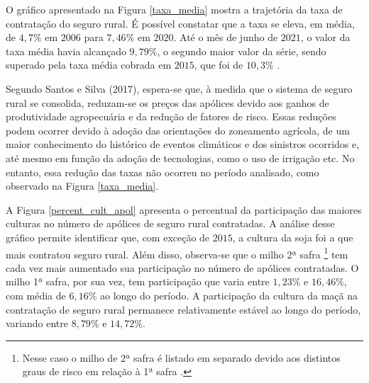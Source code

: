 
O gráfico apresentado na Figura \ref{taxa_media} mostra a trajetória da taxa de contratação do seguro rural. É possível constatar que a taxa se eleva, em média, de $4,7\%$ em $2006$ para $ 7,46\%$ em $2020$. Até o mês de junho de $2021$, o valor da taxa média havia alcançado $9,79\%$, o segundo maior valor da série, sendo superado pela taxa média cobrada em $2015$, que foi de $10,3\%$ \cite{brasil21b}.  

Segundo Santos e Silva (2017), espera-se que, à medida que o sistema de seguro rural se consolida, reduzam-se os preços das apólices devido aos ganhos de produtividade agropecuária e da redução de fatores de risco. Essas reduções podem ocorrer devido à adoção das orientações do zoneamento agrícola, de um maior conhecimento do histórico de eventos climáticos e dos sinistros ocorridos e, até mesmo em função da adoção de tecnologias, como o uso de irrigação etc. No entanto, essa redução das taxas não ocorreu no período analisado, como observado na Figura \ref{taxa_media}. 


% 


A Figura \ref{percent_cult_apol} apresenta o percentual da participação das maiores culturas no número de apólices de seguro rural contratadas. A análise desse gráfico permite identificar que, com exceção de $2015$, a cultura da soja foi a que mais contratou seguro rural. Além disso, observa-se que o milho 2ª safra \footnote{Nesse caso o milho de 2ª safra é listado em separado devido aos distintos graus de risco em relação à 1ª safra \cite{santos17}.} tem cada vez mais aumentado sua participação no número de apólices contratadas. O milho 1ª safra, por sua vez, tem participação que varia entre $1,23\%$ e $16,46\%$, com média de  $6,16\%$ ao longo do período. A participação da cultura da maçã na contratação de seguro rural permanece relativamente estável ao longo do período, variando entre $8,79\%$ e $14,72\%$. 

